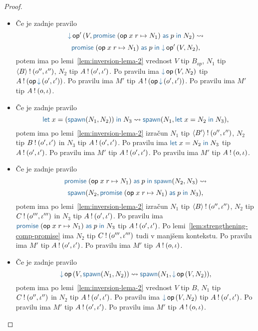 \begin{proof}
\begin{itemize}
		\item Če je zadnje pravilo $$\tmopin{op'}{V}{\tmwithrec{op}{x}{r}{N_1}{p}{N_2}} \reduces $$ $$ \tmwithrec{op}{x}{r}{N_1}{p}{\tmopin{op'}{V}{N_2}},$$ potem ima po lemi~\ref{lem:inversion-lema-2} vrednost $V$ tip $B_{op}$, $N_1$ tip $\langle B \rangle \mathbin{!} (o'', \iota'')$, $N_2$ tip $A \mathbin{!} (o', \iota')$.
		Po pravilu  ima $\tmopin{op}{V}{N_2}$ tip $\tycomp{A}{\opincomp{op}{(\o', \i')}}$.
		Po pravilu  ima $M'$ tip $\tycomp{A}{\opincomp{op}{(\o', \i')}}$.
		Po pravilu  ima $M'$ tip $A \mathbin{!} (o, \iota)$.

		\item Če je zadnje pravilo $$\tmlet{x}{(\tmspawn{N_1}{N_2})}{N_3} \reduces \tmspawn{N_1}{\tmlet{x}{N_2}{N_3}},$$ potem ima po lemi~\ref{lem:inversion-lema-2} izračun $N_1$ tip $\langle B' \rangle \mathbin{!} (o'', \iota'')$, $N_2$ tip $B \mathbin{!} (o', \iota')$ in $N_3$ tip $A \mathbin{!} (o', \iota')$.
		Po pravilu  ima $\tmlet{x}{N_2}{N_3}$ tip $A \mathbin{!} (o', \iota')$.
		Po pravilu  ima $M'$ tip $A \mathbin{!} (o', \iota')$.
		Po pravilu  ima $M'$ tip $A \mathbin{!} (o, \iota)$.

		\item Če je zadnje pravilo $$\tmwithrec{op}{x}{r}{N_1}{p}{\tmspawn{N_2}{N_3}} \reduces $$ $$ \tmspawn{N_2}{\tmwithrec{op}{x}{r}{N_1}{p}{N_3}},$$ potem ima po lemi~\ref{lem:inversion-lema-2} izračun $N_1$ tip $\langle B \rangle \mathbin{!} (o'', \iota'')$, $N_2$ tip $C \mathbin{!} (o''', \iota''')$ in $N_3$ tip $A \mathbin{!} (o', \iota')$.
		Po pravilu  ima $\tmwithrec{op}{x}{r}{N_1}{p}{N_3}$ tip $A \mathbin{!} (o', \iota')$.
		Po lemi~\ref{lem:strengthening-comp-promise} ima $N_2$ tip $C \mathbin{!} (o''', \iota''')$ tudi v manjšem kontekstu.
		Po pravilu  ima $M'$ tip $A \mathbin{!} (o', \iota')$.
		Po pravilu  ima $M'$ tip $A \mathbin{!} (o, \iota)$.

		\item Če je zadnje pravilo $$\tmopin{op}{V}{\tmspawn{N_1}{N_2}} \reduces \tmspawn{N_1}{\tmopin{op}{V}{N_2}},$$ potem ima po lemi~\ref{lem:inversion-lema-2} vrednost $V$ tip $B$, $N_1$ tip $C \mathbin{!} (o'', \iota'')$ in $N_2$ tip $A \mathbin{!} (o', \iota')$.
		Po pravilu  ima $\tmopin{op}{V}{N_2}$ tip $A \mathbin{!} (o', \iota')$.
		Po pravilu  ima $M'$ tip $A \mathbin{!} (o', \iota')$.
		Po pravilu  ima $M'$ tip $A \mathbin{!} (o, \iota)$.
		
	\end{itemize}
	
\end{proof}


